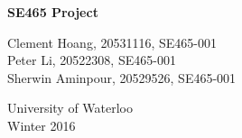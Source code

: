 \documentclass{article}
\title{}
\author{Clement Hoang }
\date{Winter 2016}
\begin{document}
  \begin{titlepage}
      \begin{center}
          \vspace*{1cm}

          \Huge
          \textbf{SE465 Project}

          \vspace{1.5cm}

          \Large
          Clement Hoang, 20531116, SE465-001 \\
          Peter Li, 20522308, SE465-001 \\
          Sherwin Aminpour, 20529526, SE465-001

          \vfill

          \vspace{0.8cm}

          \Large
          University of Waterloo\\
          Winter 2016

      \end{center}
  \end{titlepage}
\end{document}
